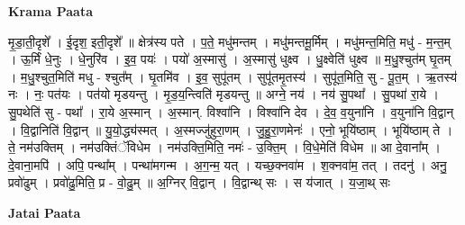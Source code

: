 \documentclass[17pt]{extarticle}
\begin{document}
\textbf{Krama Paata} \newline

मृ॒डा॒ती॒दृशे᳚ । ई॒दृश॒ इती॒दृशे᳚ ॥ क्षेत्र॑स्य पते । प॒ते॒ मधु॑मन्तम् । मधु॑मन्तमू॒र्मिम् । मधु॑मन्त॒मिति॒ मधु॑ - म॒न्त॒म् । ऊ॒र्मिं धे॒नुः । धे॒नुरि॑व । इ॒व॒ पयः॑ । पयो॑ अ॒स्मासु॑ । अ॒स्मासु॑ धुक्ष्व । धु॒क्ष्वेति॑ धुक्ष्व ॥ म॒धु॒श्चुत॑म् घृ॒तम् । म॒धु॒श्चुत॒मिति॑ मधु - श्चुत᳚म् । घृ॒तमि॑व । इ॒व॒ सुपू॑तम् । सुपू॑तमृ॒तस्य॑ । सुपू॑त॒मिति॒ सु - पू॒त॒म् । ऋ॒तस्य॑ नः । नः॒ पत॑यः । पत॑यो मृडयन्तु । मृ॒ड॒य॒न्त्विति॑ मृडयन्तु ॥ अग्ने॒ नय॑ । नय॑ सु॒पथा᳚ । सु॒पथा॑ रा॒ये । सु॒पथेति॑ सु - पथा᳚ । रा॒ये अ॒स्मान् । अ॒स्मान्. विश्वा॑नि । विश्वा॑नि देव । दे॒व॒ व॒युना॑नि । व॒युना॑नि वि॒द्वान् । वि॒द्वानिति॑ वि॒द्वान् ॥ यु॒यो॒द्ध्य॑स्मत् । अ॒स्मज्जु॑हुरा॒णम् । जु॒हु॒रा॒णमेनः॑ । एनो॒ भूयि॑ष्ठाम् । भूयि॑ष्ठाम् ते । ते॒ नम॑उक्तिम् । नम॑उक्तिंॅविधेम । नम॑उक्ति॒मिति॒ नमः॑ - उ॒क्ति॒म् । वि॒धे॒मेति॑ विधेम ॥ आ दे॒वाना᳚म् । दे॒वाना॒मपि॑ । अपि॒ पन्था᳚म् । पन्था॑मगन्म । अ॒ग॒न्म॒ यत् । यच्छ॒क्नवा॑म । श॒क्नवा॑म॒ तत् । तदनु॑ । अनु॒ प्रवो॑ढुम् । प्रवो॑ढु॒मिति॒ प्र - वो॒ढु॒म् ॥ अ॒ग्निर् वि॒द्वान् । वि॒द्वान्थ् सः । स य॑जात् । य॒जा॒थ् सः \newline

\textbf{Jatai Paata} \newline
\end{document}
